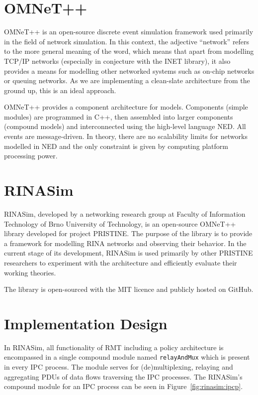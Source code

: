     \section{OMNeT++}

        OMNeT++ is an open-source discrete event simulation framework used primarily in the field of network simulation. In this context, the adjective ``network'' refers to the more general meaning of the word, which means that apart from modelling TCP/IP networks (especially in conjecture with the INET library), it also provides a means for modelling other networked systems such as on-chip networks or queuing networks. As we are implementing a clean-slate architecture from the ground up, this is an ideal approach.

        OMNeT++ provides a component architecture for models. Components (simple modules) are programmed in C++, then assembled into larger components (compound models) and interconnected using the high-level language NED. All events are message-driven. In theory, there are no scalability limits for networks modelled in NED and the only constraint is given by computing platform processing power.

    \section{RINASim}

        RINASim, developed by a networking research group at Faculty of Information Technology of Brno University of Technology, is an open-source OMNeT++ library developed for project PRISTINE. The purpose of the library is to provide a framework for modelling RINA networks and observing their behavior. In the current stage of its development, RINASim is used primarily by other PRISTINE researchers to experiment with the architecture and efficiently evaluate their working theories.

        The library is open-sourced with the MIT licence and publicly hosted on GitHub.

    \section{Implementation Design}

        In RINASim, all functionality of RMT including a policy architecture is encompassed in a single compound module named \texttt{relayAndMux} which is present in every IPC process. The module serves for (de)multiplexing, relaying and aggregating PDUs of data flows traversing the IPC processes. The RINASim's compound module for an IPC process can be seen in Figure~\ref{fig:rinasim:ipcp}.

